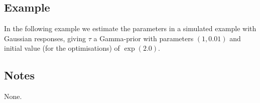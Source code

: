 \documentclass[a4paper,11pt]{article}
\begin{document}
\subsection*{Example}

In the following example we estimate the parameters in a simulated
example with Gaussian responses, giving $\tau$ a Gamma-prior with
parameters $(1, 0.01)$ and initial value (for the optimisations) of
$\exp(2.0)$.


\subsection*{Notes}

None.
\end{document}
